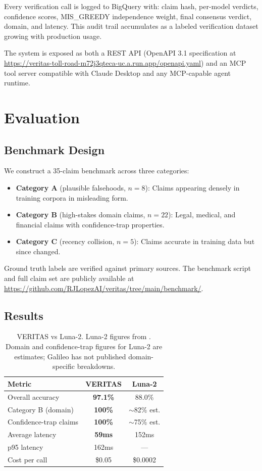 \documentclass[11pt]{article}
\begin{document}
Every verification call is logged to BigQuery with: claim hash,
per-model verdicts, confidence scores, MIS\_GREEDY independence weight,
final consensus verdict, domain, and latency. This audit trail
accumulates as a labeled verification dataset growing with production usage.

The system is exposed as both a REST API (OpenAPI 3.1 specification
at \url{https://veritas-toll-road-m72j3qteca-uc.a.run.app/openapi.yaml}) and an MCP
tool server compatible with Claude Desktop and any MCP-capable
agent runtime.

\section{Evaluation}

\subsection{Benchmark Design}

We construct a 35-claim benchmark across three categories:

\begin{itemize}
\item \textbf{Category A} (plausible falsehoods, $n=8$): Claims appearing
densely in training corpora in misleading form.
\item \textbf{Category B} (high-stakes domain claims, $n=22$): Legal,
medical, and financial claims with confidence-trap properties.
\item \textbf{Category C} (recency collision, $n=5$): Claims accurate
in training data but since changed.
\end{itemize}

Ground truth labels are verified against primary sources.
The benchmark script and full claim set are publicly available
at \url{https://github.com/RJLopezAI/veritas/tree/main/benchmark/}.

\subsection{Results}

\begin{table}[h]
\centering
\begin{tabular}{lcc}
\toprule
Metric & VERITAS & Luna-2 \\
\midrule
Overall accuracy & \textbf{97.1\%} & 88.0\% \\
Category B (domain) & \textbf{100\%} & $\sim$82\% est. \\
Confidence-trap claims & \textbf{100\%} & $\sim$75\% est. \\
Average latency & \textbf{59ms} & 152ms \\
p95 latency & 162ms & --- \\
Cost per call & \$0.05 & \$0.0002 \\
\bottomrule
\end{tabular}
\caption{VERITAS vs Luna-2. Luna-2 figures from \cite{galileo2026luna2}.
Domain and confidence-trap figures for Luna-2 are estimates; Galileo
has not published domain-specific breakdowns.}
\end{table}
\end{document}
